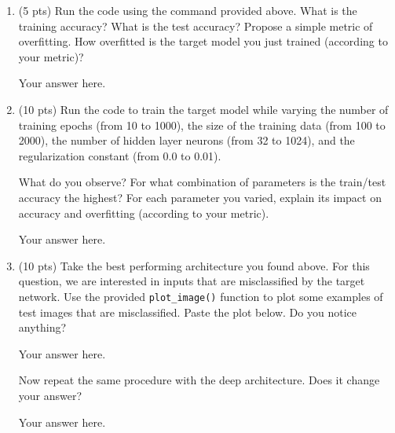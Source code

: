 \begin{enumerate}
	\item (5 pts) Run the code using the command provided above. What is the training accuracy? What is the test accuracy? Propose a simple metric of overfitting. How overfitted is the target model you just trained (according to your metric)?

	\begin{answer}
	
		Your answer here.
		
	\end{answer}
	
	\item (10 pts) Run the code to train the target model while varying the number of training epochs (from 10 to 1000), the size of the training data (from 100 to 2000), the number of hidden layer neurons (from 32 to 1024), and the regularization constant (from 0.0 to 0.01). 
		
		\medskip\noindent
		What do you observe? For what combination of parameters is the train/test accuracy the highest? For each parameter you varied, explain its impact on accuracy and overfitting (according to your metric).
	
	\begin{answer}
	
		Your answer here.
		
	\end{answer}
	
	\item (10 pts) Take the best performing architecture you found above. For this question, we are interested in inputs that are misclassified by the target network. Use the provided \texttt{plot\_image()} function to plot some examples of test images that are misclassified. Paste the plot below. Do you notice anything?
	
	\begin{answer}
	
		Your answer here.
		
	\end{answer}
	
	\medskip\noindent Now repeat the same procedure with the deep architecture. Does it change your answer?
	
	\begin{answer}
	
		Your answer here.
		
	\end{answer}

	
\end{enumerate}

